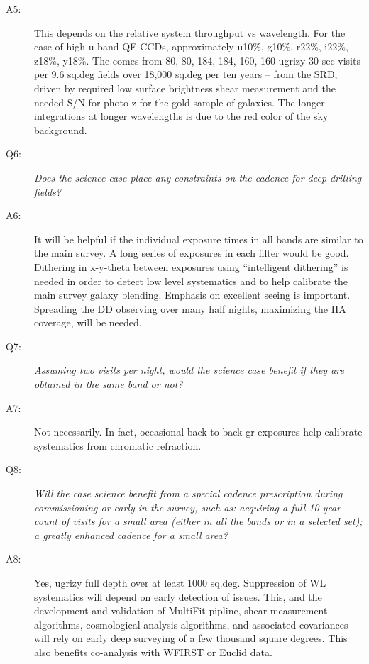 \begin{description}
\item[A5:] This depends on the relative system throughput vs wavelength.
For the case of high u band QE CCDs, approximately u10\%, g10\%, r22\%,
i22\%, z18\%, y18\%. The comes from 80, 80, 184, 184, 160, 160 ugrizy
30-sec visits per 9.6 sq.deg fields over 18,000 sq.deg per ten years --
from the SRD, driven by required low surface brightness shear
measurement and the needed S/N for photo-z for the gold sample of
galaxies. The longer integrations at longer wavelengths is due to the
red color of the sky background.

\item[Q6:] {\it Does the science case place any constraints on the
cadence for deep drilling fields?}

\item[A6:] It will be helpful if the individual exposure times in all
bands are similar to the main survey. A long series of exposures in each
filter would be good. Dithering in x-y-theta between exposures using
“intelligent dithering” is needed in order to detect low level
systematics and to help calibrate the main survey galaxy blending.
Emphasis on excellent seeing is important. Spreading the DD observing
over many half nights, maximizing the HA coverage, will be needed.

\item[Q7:] {\it Assuming two visits per night, would the science case
benefit if they are obtained in the same band or not?}

\item[A7:] Not necessarily. In fact, occasional back-to back gr
exposures help calibrate systematics from chromatic refraction.

\item[Q8:] {\it Will the case science benefit from a special cadence
prescription during commissioning or early in the survey, such as:
acquiring a full 10-year count of visits for a small area (either in all
the bands or in a  selected set); a greatly enhanced cadence for a small
area?}

\item[A8:] Yes, ugrizy full depth over at least 1000 sq.deg. Suppression
of WL systematics will depend on early detection of issues. This, and
the development and validation of MultiFit pipline, shear measurement
algorithms, cosmological analysis algorithms, and associated covariances
will rely on early deep surveying of a few thousand square degrees. This
also benefits co-analysis with WFIRST or Euclid data.


\end{description}
